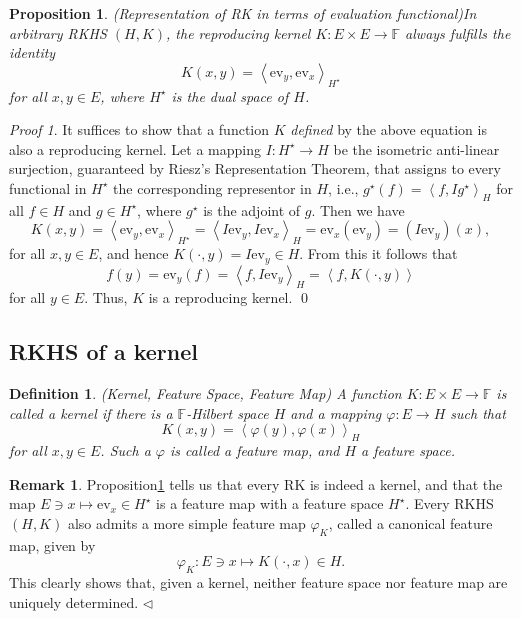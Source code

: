 \documentclass[a4paper,12pt]{article}
\newtheorem{prp}[thm]{Proposition}
\newtheorem{dfn}[thm]{Definition}
\theoremstyle{remark}
\newtheorem*{prf}{Proof}
\theoremstyle{definition}
\newtheorem{rem}[thm]{Remark}
\theoremstyle{definition}
\theoremstyle{definition}
\newcommand{\ip}[2]{\left<#1, #2 \right>}
\newcommand{\ev}[1]{\mathrm{ev}_{#1}}
\newcommand{\adj}[1]{#1^{\star}}
\newcommand{\fin}{\hfill \( \triangleleft \) }
\begin{document}
\begin{prp} (Representation of RK in terms of evaluation functional)\label{Representation of RK in terms of ev}
	In arbitrary RKHS \( (H,K) \), the reproducing kernel \( K:E \times E \to \mathbb{F} \) always fulfills the identity
	\begin{equation*}
		K(x,y) = \ip{\ev{y}}{\ev{x}}_{\adj{H}}
	\end{equation*}
	for all \( x,y \in E \), where \( \adj{H} \) is the dual space of \( H \).
\end{prp}
\begin{prf}
	It suffices to show that a function \( K \) \textit{defined} by the above equation is also a reproducing kernel.
	Let a mapping \( I:\adj{H}\to H \) be the isometric anti-linear surjection,  guaranteed by Riesz's Representation Theorem, that assigns to every functional in \( \adj{H} \) the corresponding representor in \( H \), i.e., \( \adj{g}(f)=\ip{f}{I \adj{g}}_H \) for all \( f \in H \) and \( g \in \adj{H} \), where \( \adj{g} \) is the adjoint of \( g \). Then we have
	\begin{equation*}
		K(x,y) = \ip{\ev{y}}{\ev{x}}_{\adj{H}}
		= \ip{I \ev{y}}{I \ev{x}}_H
		= \ev{x} \left( \ev{y} \right) = \left( I \ev{y} \right)(x),
	\end{equation*}
	for all \( x,y \in E \), and hence \( K(\cdot ,y) = I \ev{y} \in H \). From this it follows that
	\begin{equation*}
		f(y) = \ev{y}(f) = \ip{f}{I \ev{y}}_H = \ip{f}{K(\cdot ,y)}
	\end{equation*}
	for all \( y \in E \). Thus, \( K \) is a reproducing kernel.
	\qed\end{prf}

\subsection{RKHS of a kernel}

\begin{dfn} (Kernel, Feature Space, Feature Map)
	A function \( K:E \times E \to \mathbb{F} \) is called a kernel if there is a \( \mathbb{F}\)-Hilbert space \( H \) and a mapping \( \varphi:E \to H \) such that
	\begin{equation*}
		K(x,y) = \ip{\varphi(y)}{\varphi(x)}_H
	\end{equation*}
	for all \( x,y \in E \).
	Such a \( \varphi \) is called a feature map, and \( H \) a feature space.
\end{dfn}
\begin{rem}
	Proposition\ref{Representation of RK in terms of ev} tells us that every RK is indeed a kernel, and that the map \( E \ni x \mapsto \ev{x} \in \adj{H} \) is a feature map with a feature space \( \adj{H} \).
	Every RKHS \( (H,K) \) also admits a more simple feature map \( \varphi_K \), called a canonical feature map, given by
	\begin{equation*}
		\varphi_K:E \ni x \mapsto K(\cdot ,x) \in H.
	\end{equation*}
	This clearly shows that, given a kernel, neither feature space nor feature map are uniquely determined.
	\fin\end{rem}
\end{document}
